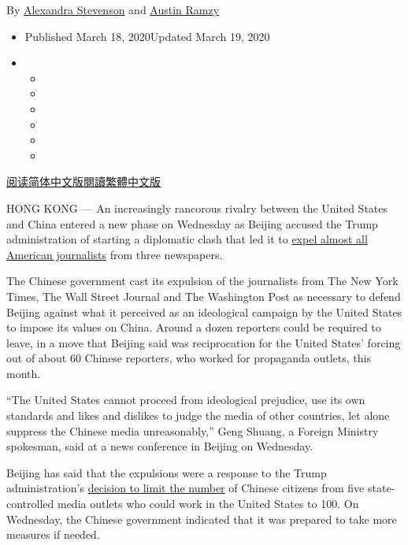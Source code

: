 By
\href{https://www.nytimes3xbfgragh.onion/by/alexandra-stevenson}{Alexandra
Stevenson} and
\href{https://www.nytimes3xbfgragh.onion/by/austin-ramzy}{Austin Ramzy}

\begin{itemize}
\item
  Published March 18, 2020Updated March 19, 2020
\item
  \begin{itemize}
  \item
  \item
  \item
  \item
  \item
  \item
  \end{itemize}
\end{itemize}

\href{https://cn.nytimes3xbfgragh.onion/china/20200319/china-expels-journalists/}{阅读简体中文版}\href{https://cn.nytimes3xbfgragh.onion/china/20200319/china-expels-journalists/zh-han}{閱讀繁體中文版}

HONG KONG --- An increasingly rancorous rivalry between the United
States and China entered a new phase on Wednesday as Beijing accused the
Trump administration of starting a diplomatic clash that led it to
\href{https://www.nytimes3xbfgragh.onion/2020/03/17/business/media/china-expels-american-journalists.html}{expel
almost all American journalists} from three newspapers.

The Chinese government cast its expulsion of the journalists from The
New York Times, The Wall Street Journal and The Washington Post as
necessary to defend Beijing against what it perceived as an ideological
campaign by the United States to impose its values on China. Around a
dozen reporters could be required to leave, in a move that Beijing said
was reciprocation for the United States' forcing out of about 60 Chinese
reporters, who worked for propaganda outlets, this month.

``The United States cannot proceed from ideological prejudice, use its
own standards and likes and dislikes to judge the media of other
countries, let alone suppress the Chinese media unreasonably,'' Geng
Shuang, a Foreign Ministry spokesman, said at a news conference in
Beijing on Wednesday.

Beijing has said that the expulsions were a response to the Trump
administration's
\href{https://www.nytimes3xbfgragh.onion/2020/03/02/world/asia/china-journalists-diplomats-expulsion.html}{decision
to limit the number} of Chinese citizens from five state-controlled
media outlets who could work in the United States to 100. On Wednesday,
the Chinese government indicated that it was prepared to take more
measures if needed.

